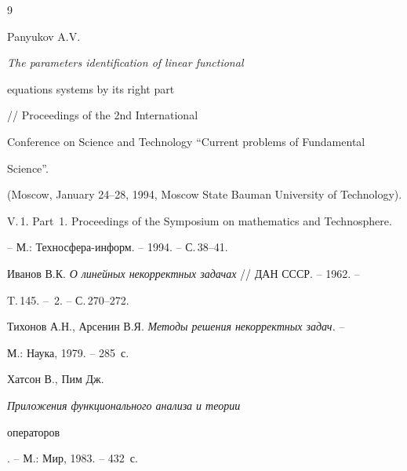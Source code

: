 \begin{thebibliography}{9}







Panyukov A.V. {\em The parameters identification of linear functional


equations systems by its right part} // Proceedings of the 2nd International


Conference on Science and Technology ``Current problems of Fundamental


Science''.


(Moscow, January 24--28, 1994, Moscow State Bauman University of Technology).


V.\,1. Part~1. Proceedings of the Symposium on mathematics and Technosphere.


-- М.: Техносфера-информ. -- 1994. -- С.\,38--41.







Иванов В.К. {\em О линейных некорректных задачах} // ДАН СССР. -- 1962. --


T.\,145. -- \No\,2. -- С.\,270--272.







Тихонов А.Н., Арсенин В.Я. {\em Методы решения некорректных задач.} --


М.: Наука, 1979. -- 285~с.







Хатсон В., Пим Дж. {\em Приложения функционального анализа и теории


операторов}. -- М.: Мир, 1983. -- 432~с. 





\end{thebibliography}





\vskip 2cm












\label{end}





